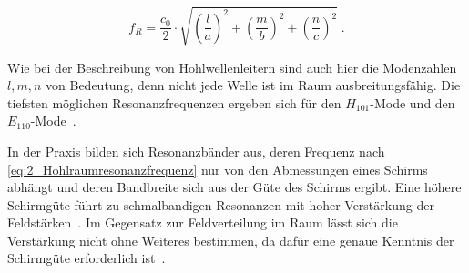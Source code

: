 \begin{equation}
    f_R = \frac{c_0}{2}\cdot \sqrt{\left(\frac{l}{a}\right)^2+\left(\frac{m}{b}\right)^2+\left(\frac{n}{c}\right)^2} \; \text{.}
    \label{eq:2_Hohlraumresonanzfrequenz}
\end{equation}


Wie bei der Beschreibung von Hohlwellenleitern sind auch hier die Modenzahlen $l, m, n$ von Bedeutung, denn nicht jede Welle ist im Raum ausbreitungsfähig. Die tiefsten möglichen Resonanzfrequenzen ergeben sich für den $H_{101}$-Mode und den $E_{110}$-Mode~\cite{Klassische_Elektrodynamik, Handbook_Shielding_Materials_and_Performance}. 
\par
\vspace{\linespace}
In der Praxis bilden sich Resonanzbänder aus, deren Frequenz nach \Gleichung\eqref{eq:2_Hohlraumresonanzfrequenz} nur von den Abmessungen eines Schirms abhängt und deren Bandbreite sich aus der Güte des Schirms ergibt. Eine höhere Schirmgüte führt zu schmalbandigen Resonanzen mit hoher Verstärkung der Feldstärken~\cite{EM_Schirmung}. Im Gegensatz zur Feldverteilung im Raum lässt sich die Verstärkung nicht ohne Weiteres bestimmen, da dafür eine genaue Kenntnis der Schirmgüte erforderlich ist~\cite{EM_Schirmung}.


